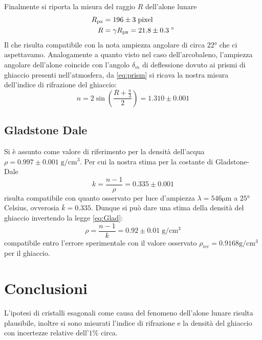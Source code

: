 \documentclass{report}[a4paper,11pt]
\begin{document}
Finalmente si riporta la misura del raggio $R$ dell'alone lunare
\begin{align}
R_{\rm px} &= 196 \pm 3 \; \rm pixel \\
R &= \gamma R_{\rm px} = 21.8 \pm 0.3 \; \si{\degree}
\end{align}
Il che risulta compatibile con la nota ampiezza angolare di circa $22 \si{\degree}$ che ci aspettavamo.
Analogamente a quanto visto nel caso dell'arcobaleno, l'ampiezza angolare dell'alone coincide con l'angolo $\delta_m$ di deflessione dovuto ai prismi di ghiaccio presenti nell'atmosfera, da \eqref{eq:prism} si ricava la nostra misura dell'indice di rifrazione del ghiaccio:
\begin{equation}\label{eq: refr_ice}
n = 2 \sin{\left(\frac{R + \frac{\pi}{3}}{2}\right)} = 1.310 \pm 0.001
\end{equation}
\subsection{Gladstone Dale}
Si è assunto come valore di riferimento per la densità dell'acqua $\rho = 0.997 \pm 0.001 \; \si{\g/\cm^3}$.
Per cui la nostra stima per la costante di Gladstone-Dale
\begin{equation}
k = \frac{n-1}{\rho} = 0.335 \pm 0.001
\end{equation}
risulta compatibile con quanto osservato \cite{Gladstone} per luce d'ampiezza $\lambda = 546 \si{\micro \metre}$ a $25 \si{\degree}$ Celsius, ovverosia $\bar{k} = 0.335$.
Dunque si può dare una stima della densità del ghiaccio invertendo la legge \eqref{eq:Glad}:
\begin{equation}\label{eq:rho_ice}
\rho = \frac{n-1}{k} = 0.92 \pm 0.01 \; \si{\g/\cm^3} 
\end{equation}
compatibile entro l'errore sperimentale con il valore osservato \cite{ice} $\rho_{ice} = 0.9168 \si{\g/\cm^3}$ per il ghiaccio.
\section{Conclusioni}
L'ipotesi di cristalli esagonali come causa del fenomeno dell'alone lunare risulta plausibile, inoltre si sono misurati l'indice di rifrazione e la densità del ghiaccio con incertezze relative dell'$1\%$ circa.
%

%

\medskip


\end{document}
